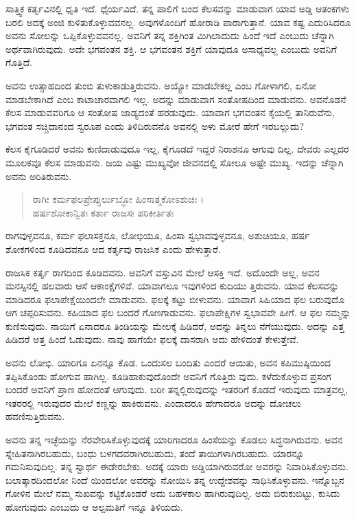 ಸಾತ್ತ್ವಿಕ ಕರ್ತೃವಿನಲ್ಲಿ ಧೃತಿ ಇದೆ. ಧೈರ್ಯವಿದೆ. ತನ್ನ ಪಾಲಿಗೆ ಬಂದ ಕೆಲಸವನ್ನು ಮಾಡುವಾಗ ಯಾವ ಅಡ್ಡಿ ಆತಂಕಗಳು ಬರಲಿ ಅದಕ್ಕೆ ಅಂಜಿ ಕುಳಿತುಕೊಳ್ಳುವವನಲ್ಲ. ಅವುಗಳೊಂದಿಗೆ ಹೋರಾಡಿ ಪಾರಾಗುತ್ತಾನೆ. ಯಾವ ಕಷ್ಟ ಎದುರಿಸಿದರೂ ಅವನು ಸೋಲನ್ನು ಒಪ್ಪಿಕೊಳ್ಳುವವನಲ್ಲ. ಅವನಿಗೆ ತನ್ನ ಶಕ್ತಿಗಿಂತ ಮಿಗಿಲಾದುದು ಹಿಂದೆ ಇದೆ ಎಂಬುದು ಚೆನ್ನಾಗಿ ಅರ್ಥವಾಗಿರುವುದು. ಅದೇ ಭಗವಂತನ ಶಕ್ತಿ. ಆ ಭಗವಂತನ ಶಕ್ತಿಗೆ ಯಾವುದೂ ಅಸಾಧ್ಯವಲ್ಲ ಎಂಬುದು ಅವನಿಗೆ ಗೊತ್ತಿದೆ.

ಅವನು ಉತ್ಸಾಹದಿಂದ ತುಂಬಿ ತುಳುಕಾಡುತ್ತಿರುವನು. ಅಯ್ಯೋ ಮಾಡಬೇಕಲ್ಲ ಎಂಬ ಗೋಳಾಗಲಿ, ಏನೋ ಮಾಡಬೇಕಾಗಿದೆ ಎಂಬ ಕಾಟಾಚಾರವಾಗಲಿ ಇಲ್ಲ. ಅದನ್ನು ಮಾಡುವಾಗ ಸಂತೋಷದಿಂದ ಮಾಡುವನು. ಅವನೊಡನೆ ಕೆಲಸ ಮಾಡುವವರಿಗೂ ಆ ಸಂತೋಷ ಜಾಡ್ಯದಂತೆ ಹರಡುವುದು. ಯಾವಾಗ ಭಗವಂತನ ಕೈಯಲ್ಲಿ ತಾನಿರುವೆನು, ಭಗವಂತ ಸಚ್ಚಿದಾನಂದ ಸ್ವರೂಪ ಎಂದು ತಿಳಿದಿರುವನೊ ಅವನಲ್ಲಿ ಅಳು ಮೋರೆ ಹೇಗೆ ಇರಬಲ್ಲುದು?

ಕೆಲಸ ಕೈಗೂಡಿದರೆ ಅವನು ಕುಣಿದಾಡುವುದೂ ಇಲ್ಲ, ಕೈಗೂಡದೆ ಇದ್ದರೆ ನಿರಾಶನೂ ಆಗುವು ದಿಲ್ಲ. ದೇವರು ಎಲ್ಲದರ ಮೂಲಕವೂ ಕೆಲಸ ಮಾಡುವನು. ಜಯ ಎಷ್ಟು ಮುಖ್ಯವೋ ಜೀವನದಲ್ಲಿ ಸೋಲೂ ಅಷ್ಟೇ ಮುಖ್ಯ. ಇದನ್ನು ಚೆನ್ನಾಗಿ ಅವನು ಅರಿತಿರುವನು.

\begin{verse}
ರಾಗೀ ಕರ್ಮಫಲಪ್ರೇಪ್ಸುರ್ಲುಬ್ಧೋ ಹಿಂಸಾತ್ಮಕೋಽಶುಚಿಃ ।\\ಹರ್ಷಶೋಕಾನ್ವಿತಃ ಕರ್ತಾ ರಾಜಸಃ ಪರಿಕೀರ್ತಿತಃ 
\end{verse}

{\small ರಾಗವುಳ್ಳವನೂ, ಕರ್ಮ ಫಲಾಸಕ್ತನೂ, ಲೋಭಿಯೂ, ಹಿಂಸಾ ಸ್ವಭಾವವುಳ್ಳವನೂ, ಅಶುಚಿಯೂ, ಹರ್ಷ ಶೋಕಗಳಿಂದ ಕೂಡಿದವನೂ ಆದ ಕರ್ತೃವು ರಾಜಸಿಕ ಎಂದು ಹೇಳುತ್ತಾರೆ.}

ರಾಜಸಿಕ ಕರ್ತೃ ರಾಗದಿಂದ ಕೂಡಿದವನು. ಅವನಿಗೆ ವಸ್ತುವಿನ ಮೇಲೆ ಆಸಕ್ತಿ ಇದೆ. ಅದೊಂದೇ ಅಲ್ಲ, ಅವನ ಮನಸ್ಸಿನಲ್ಲಿ ಹಲವಾರು ಆಸೆ ಆಕಾಂಕ್ಷೆಗಳಿವೆ. ಯಾವಾಗಲೂ ಇವುಗಳಿಂದ ಕುದಿಯು ತ್ತಿರುವನು. ಯಾವ ಕೆಲಸವನ್ನು ಮಾಡಿದರೂ ಫಲಾಪೇಕ್ಷೆಯಿಂದಲೇ ಮಾಡುವನು. ಫಲಕ್ಕೆ ಕಟ್ಟು ಬೀಳುವನು. ಯಾವಾಗ ಸಿಹಿಯಾದ ಫಲ ಬರುವುದೊ ಆಗ ಚಪ್ಪರಿಸುವನು. ಕಹಿಯಾದ ಫಲ ಬಂದರೆ ಗೊಣಗಾಡುವನು. ಫಲಾಪೇಕ್ಷಿಗಳ ಸ್ವಭಾವವೇ ಹೀಗೆ. ಆ ಫಲ ನಮ್ಮನ್ನು ಕುಣಿಸುವುದು. ನಾಯಿಗೆ ಏನಾದರೂ ತಿಂಡಿಯನ್ನು ಮೇಲಕ್ಕೆ ಹಿಡಿದರೆ, ಅದನ್ನು ತಿನ್ನಲು ನೆಗೆಯುವುದು. ಅದನ್ನು ಎತ್ತ ಹಿಡಿದರೆ ಅತ್ತ ಹಿಂದೆ ಓಡುವುದು. ನಾವು ಹಾಗೆಯೇ ಫಲಕ್ಕೆ ದಾಸರಾಗಿ ಅದು ಹೇಳಿದಂತೆ ಕೇಳುತ್ತೇವೆ.

ಅವನು ಲೋಭಿ. ಯಾರಿಗೂ ಏನನ್ನೂ ಕೊಡ. ಒಂದುಸಲ ಬಂದಿತು ಎಂದರೆ ಆಯಿತು, ಅವನ ಕಪಿಮುಷ್ಠಿಯಿಂದ ತಪ್ಪಿಸಿಕೊಂಡು ಹೋಗುವ ಹಾಗಿಲ್ಲ. ಕೂಡಿಹಾಕುವುದೊಂದೇ ಅವನಿಗೆ ಗೊತ್ತಿರು ವುದು. ಕಳೆದುಕೊಳ್ಳುವ ಪ್ರಸಂಗ ಬಂದರೆ ಅವನಿಗೆ ಪ್ರಾಣ ಹೋದಂತೆ ಆಗುವುದು. ಬರೀ ತನ್ನಲ್ಲಿರುವುದನ್ನು ಇತರರಿಗೆ ಕೊಡದೆ ಇರುವುದು ಮಾತ್ರವಲ್ಲ, ಇತರರಲ್ಲಿ ಇರುವುದರ ಮೇಲೆ ಕಣ್ಣನ್ನು ಹಾಕಿರುವನು. ಎಂದಾದರೂ ಹೇಗಾದರೂ ಅದನ್ನು ದೋಚಲು ಹವಣಿಸುತ್ತಿರುವನು.

ಅವನು ತನ್ನ ಇಚ್ಛೆಯನ್ನು ನೆರವೇರಿಸಿಕೊಳ್ಳುವುದಕ್ಕೆ ಯಾರಿಗಾದರೂ ಹಿಂಸೆಯನ್ನು ಕೊಡಲು ಸಿದ್ಧನಾಗಿರುವನು. ಅವನ ಸ್ನೇಹಿತನಾಗಿರಬಹುದು, ಬಂಧು ಬಳಗದವರಾಗಿರಬಹುದು, ತಂದೆ ತಾಯಿಗಳಾಗಿರಬಹುದು. ಯಾರನ್ನೂ ಗಮನಿಸುವುದಿಲ್ಲ. ತನ್ನ ಸ್ವಾರ್ಥ ಈಡೇರಬೇಕು. ಅದಕ್ಕೆ ಯಾರು ಅಡ್ಡಿಯಾಗಿರುವರೋ ಅವರನ್ನು ನಿವಾರಿಸಿಕೊಳ್ಳುವನು. ಬಲಾತ್ಕಾರದಿಂದಲೋ ನಿಂದೆ ಯಿಂದಲೋ ಅವರನ್ನು ನೋಯಿಸಿ ತನ್ನ ಉದ್ದೇಶವನ್ನು ಸಾಧಿಸಿಕೊಳ್ಳುವನು. ಇನ್ನೊಬ್ಬನ ಗೋಳಿನ ಮೇಲೆ ನಮ್ಮ ಸುಖವನ್ನು ಕಟ್ಟಿಕೊಂಡರೆ ಅದು ಬಹಳಕಾಲ ಹಾಗಿರುವುದಿಲ್ಲ. ಅದು ಬಿರುಕುಬಿಟ್ಟು, ಕುಸಿದು ಹೋಗುವುದು ಎಂಬುದು ಆ ಅಲ್ಪಮತಿಗೆ ಇನ್ನೂ ತಿಳಿಯದು.

